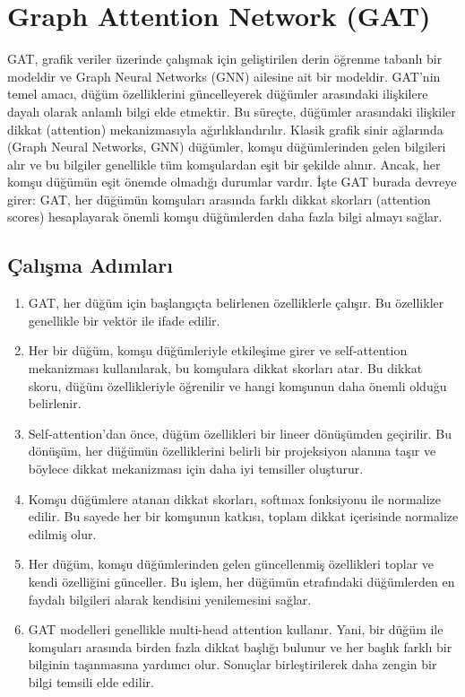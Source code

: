 \section{Graph Attention Network (GAT)}

GAT, grafik veriler üzerinde çalışmak için geliştirilen derin öğrenme tabanlı bir modeldir ve Graph Neural Networks (GNN) ailesine ait bir modeldir. GAT'nin temel amacı, düğüm özelliklerini güncelleyerek düğümler arasındaki ilişkilere dayalı olarak anlamlı bilgi elde etmektir. Bu süreçte, düğümler arasındaki ilişkiler dikkat (attention) mekanizmasıyla ağırlıklandırılır. Klasik grafik sinir ağlarında (Graph Neural Networks, GNN) düğümler, komşu düğümlerinden gelen bilgileri alır ve bu bilgiler genellikle tüm komşulardan eşit bir şekilde alınır. Ancak, her komşu düğümün eşit önemde olmadığı durumlar vardır. İşte GAT burada devreye girer: GAT, her düğümün komşuları arasında farklı dikkat skorları (attention scores) hesaplayarak önemli komşu düğümlerden daha fazla bilgi almayı sağlar.

\subsection{Çalışma Adımları}

\begin{enumerate}
    \item GAT, her düğüm için başlangıçta belirlenen özelliklerle çalışır. Bu özellikler genellikle bir vektör ile ifade edilir.
    \item Her bir düğüm, komşu düğümleriyle etkileşime girer ve self-attention mekanizması kullanılarak, bu komşulara dikkat skorları atar. Bu dikkat skoru, düğüm özellikleriyle öğrenilir ve hangi komşunun daha önemli olduğu belirlenir.
    \item Self-attention’dan önce, düğüm özellikleri bir lineer dönüşümden geçirilir. Bu dönüşüm, her düğümün özelliklerini belirli bir projeksiyon alanına taşır ve böylece dikkat mekanizması için daha iyi temsiller oluşturur.
    \item Komşu düğümlere atanan dikkat skorları, softmax fonksiyonu ile normalize edilir. Bu sayede her bir komşunun katkısı, toplam dikkat içerisinde normalize edilmiş olur.
    \item Her düğüm, komşu düğümlerinden gelen güncellenmiş özellikleri toplar ve kendi özelliğini günceller. Bu işlem, her düğümün etrafındaki düğümlerden en faydalı bilgileri alarak kendisini yenilemesini sağlar.
    \item GAT modelleri genellikle multi-head attention kullanır. Yani, bir düğüm ile komşuları arasında birden fazla dikkat başlığı bulunur ve her başlık farklı bir bilginin taşınmasına yardımcı olur. Sonuçlar birleştirilerek daha zengin bir bilgi temsili elde edilir.
\end{enumerate}

\newpage